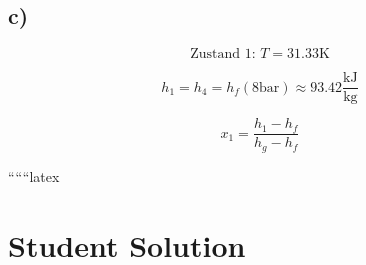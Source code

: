 

\subsection*{c)}

\[
\text{Zustand 1: } T = 31.33 \text{K}
\]

\[
h_1 = h_4 = h_f (8 \text{bar}) \approx 93.42 \frac{\text{kJ}}{\text{kg}}
\]

\[
x_1 = \frac{h_1 - h_f}{h_g - h_f}
\]

``````latex


\section*{Student Solution}